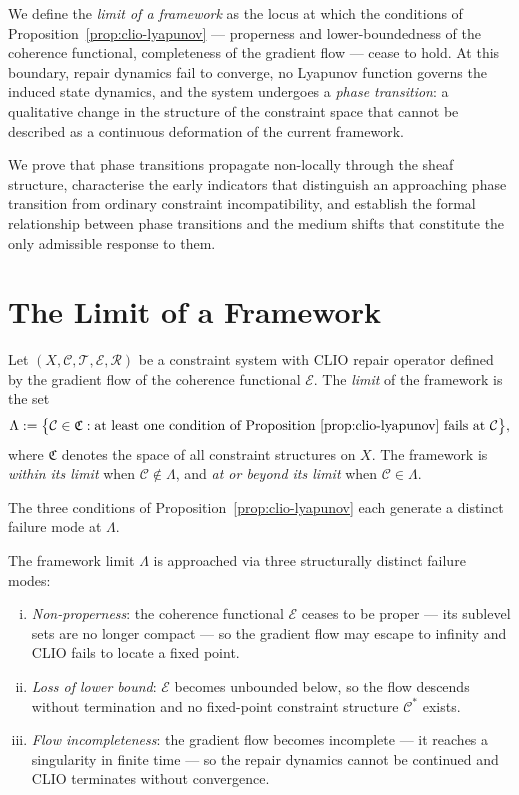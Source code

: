 \documentclass[11pt,openany]{book}
\begin{document}
We define the \emph{limit of a framework} as the locus
at which the conditions of Proposition~\ref{prop:clio-lyapunov}
--- properness and lower-boundedness of the coherence
functional, completeness of the gradient flow --- cease to
hold.  At this boundary, repair dynamics fail to converge,
no Lyapunov function governs the induced state dynamics,
and the system undergoes a \emph{phase transition}: a
qualitative change in the structure of the constraint space
that cannot be described as a continuous deformation of the
current framework.

We prove that phase transitions propagate non-locally
through the sheaf structure, characterise the early
indicators that distinguish an approaching phase transition
from ordinary constraint incompatibility, and establish the
formal relationship between phase transitions and the medium
shifts that constitute the only admissible response to them.

\section{The Limit of a Framework}
\label{sec:limit}

\begin{definition}
\label{def:framework-limit}
Let $(X, \mathcal{C}, \mathcal{T}, \mathcal{E},
\mathcal{R})$ be a constraint system with CLIO repair
operator defined by the gradient flow of the coherence
functional $\mathcal{E}$.  The \emph{limit} of the
framework is the set
\[
  \Lambda := \bigl\{ \mathcal{C} \in \mathfrak{C} :
    \text{at least one condition of
    Proposition~\ref{prop:clio-lyapunov} fails at }
    \mathcal{C} \bigr\},
\]
where $\mathfrak{C}$ denotes the space of all constraint
structures on $X$.  The framework is \emph{within its
limit} when $\mathcal{C} \notin \Lambda$, and \emph{at or
beyond its limit} when $\mathcal{C} \in \Lambda$.
\end{definition}

The three conditions of Proposition~\ref{prop:clio-lyapunov}
each generate a distinct failure mode at $\Lambda$.

\begin{proposition}
\label{prop:three-modes}
The framework limit $\Lambda$ is approached via three
structurally distinct failure modes:
\begin{enumerate}[(i)]
  \item \emph{Non-properness}: the coherence functional
    $\mathcal{E}$ ceases to be proper --- its sublevel sets
    are no longer compact --- so the gradient flow may
    escape to infinity and CLIO fails to locate a fixed
    point.
  \item \emph{Loss of lower bound}: $\mathcal{E}$ becomes
    unbounded below, so the flow descends without
    termination and no fixed-point constraint structure
    $\mathcal{C}^*$ exists.
  \item \emph{Flow incompleteness}: the gradient flow
    becomes incomplete --- it reaches a singularity in
    finite time --- so the repair dynamics cannot be
    continued and CLIO terminates without convergence.
\end{enumerate}
\end{proposition}
\end{document}
